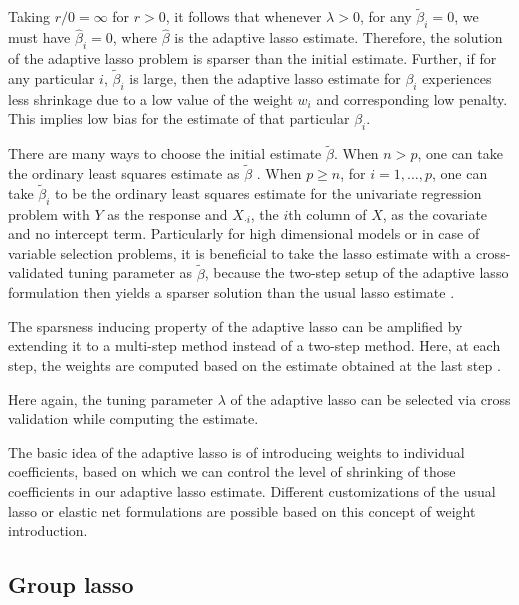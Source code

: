 \documentclass[
]{book}
\begin{document}
Taking \(r / 0 = \infty\) for \(r > 0\), it follows that whenever \(\lambda > 0\), for any \(\tilde{\beta}_i = 0\), we must have \(\hat{\beta}_i = 0\), where \(\hat{\beta}\) is the adaptive lasso estimate. Therefore, the solution of the adaptive lasso problem is sparser than the initial estimate. Further, if for any particular \(i\), \(\tilde{\beta}_i\) is large, then the adaptive lasso estimate for \(\beta_i\) experiences less shrinkage due to a low value of the weight \(w_i\) and corresponding low penalty. This implies low bias for the estimate of that particular \(\beta_i\).

There are many ways to choose the initial estimate \(\tilde{\beta}\). When \(n > p\), one can take the ordinary least squares estimate as \(\tilde{\beta}\) \citep{zou2006adaptive}. When \(p \ge n\), for \(i = 1, \ldots, p\), one can take \(\tilde{\beta}_i\) to be the ordinary least squares estimate for the univariate regression problem with \(Y\) as the response and \(X_{\cdot i}\), the \(i\)th column of \(X\), as the covariate and no intercept term. Particularly for high dimensional models or in case of variable selection problems, it is beneficial to take the lasso estimate with a cross-validated tuning parameter as \(\tilde{\beta}\), because the two-step setup of the adaptive lasso formulation then yields a sparser solution than the usual lasso estimate \citep{buhlmann2011statistics}.

The sparsness inducing property of the adaptive lasso can be amplified by extending it to a multi-step method instead of a two-step method. Here, at each step, the weights are computed based on the estimate obtained at the last step \citep{buhlmann2008discussion}.

Here again, the tuning parameter \(\lambda\) of the adaptive lasso can be selected via cross validation while computing the estimate.

The basic idea of the adaptive lasso is of introducing weights to individual coefficients, based on which we can control the level of shrinking of those coefficients in our adaptive lasso estimate. Different customizations of the usual lasso or elastic net formulations are possible based on this concept of weight introduction.

\hypertarget{grouplasso-description}{%
\subsection{Group lasso}\label{grouplasso-description}}
\end{document}
